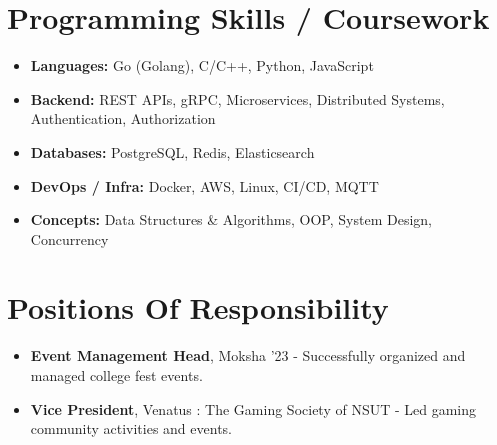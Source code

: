 \documentclass[letterpaper,11pt]{article}
\begin{document}
\vspace{-19pt}
\section{Programming Skills / Coursework}
    \begin{itemize}[leftmargin=0.15in]
       \item{\textbf{Languages:} Go (Golang), C/C++, Python, JavaScript}

\vspace{-3pt}

\item{\textbf{Backend:} REST APIs, gRPC, Microservices, Distributed Systems, Authentication, Authorization}

\vspace{-3pt}

\item{\textbf{Databases:} PostgreSQL, Redis, Elasticsearch}

\vspace{-3pt}

\item{\textbf{DevOps / Infra:} Docker, AWS, Linux, CI/CD, MQTT}

\vspace{-3pt}

\item{\textbf{Concepts:} Data Structures \& Algorithms, OOP, System Design, Concurrency}
    \end{itemize}
    
\vspace{-19pt}
\section{Positions Of Responsibility}
    \begin{itemize}[leftmargin=0.15in]
        \item{\textbf{Event Management Head}, Moksha '23 - Successfully organized and managed college fest events.}
        \vspace{-3pt}
        
        \item{\textbf{Vice President}, Venatus : The Gaming Society of NSUT - Led gaming community activities and events.}
        \vspace{-3pt}
    \end{itemize}

\end{document}
